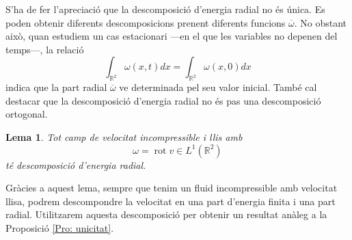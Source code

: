 \documentclass{article}
\numberwithin{equation}{section}
\DeclareMathOperator{\rot}{rot}
\newtheorem{lema}{Lema}[section]
\begin{document}
S'ha de fer l'apreciaci\'{o} que la descomposici\'{o} d'energia radial no \'{e}s \'{u}nica. Es poden obtenir diferents descomposicions prenent diferents funcions $\overline\omega$. No obstant aix\`{o}, quan estudiem un cas estacionari ---en el que les variables no depenen del temps---, la relaci\'{o}
\[\int_{\mathbb{R}^2}\omega(x,t)dx=\int_{\mathbb{R}^2}\omega(x,0)dx\]
indica que la part radial $\overline\omega$ ve determinada pel seu valor inicial. Tamb\'{e} cal destacar que la descomposici\'{o} d'energia radial no \'{e}s pas una descomposici\'{o} ortogonal.

\begin{lema}
Tot camp de velocitat incompressible i llis amb
\[\omega=\rot v\in L^1(\mathbb{R}^2)\]
t\'{e} descomposici\'{o} d'energia radial.
\end{lema}

Gr\`{a}cies a aquest lema, sempre que tenim un fluid incompressible amb velocitat llisa, podrem descompondre la velocitat en una part d'energia finita i una part radial. Utilitzarem aquesta descomposici\'{o} per obtenir un resultat an\`{a}leg a la Proposici\'{o} \ref{Pro: unicitat}.
\end{document}
